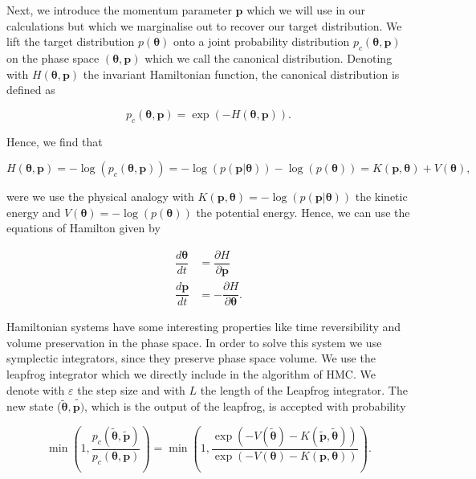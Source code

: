 \documentclass[12pt,a4paper,oneside]{book}
\begin{document}
Next, we introduce the momentum parameter $\bm{p}$ which we will use in our calculations but which we marginalise out to recover our target distribution. We lift the target distribution $p(\bm{\theta}) $ onto a joint probability distribution $p_c(\bm{\theta}, \bm{p})$ on the phase space $(\bm{\theta}, \bm{p})$ which we call the canonical distribution. Denoting with $H(\bm{\theta}, \bm{p})$ the invariant Hamiltonian function, the canonical distribution is defined as

\begin{equation}
p_c(\bm{\theta}, \bm{p}) = \exp(-H(\bm{\theta}, \bm{p})).
\end{equation}

Hence, we find that 

\begin{equation}
H(\bm{\theta}, \bm{p}) = -\log(p_c(\bm{\theta}, \bm{p}) ) = -\log(p( \bm{p} |\bm{\theta})) - \log(p(\bm{\theta})) = K(\bm{p}, \bm{\theta}) + V(\bm{\theta}),
\end{equation}

were we use the physical analogy with $K(\bm{p}, \bm{\theta}) = -\log(p( \bm{p} |\bm{\theta}))$ the kinetic energy and $V(\bm{\theta}) = - \log(p(\bm{\theta})) $ the potential energy. Hence, we can use the equations of Hamilton given by

\begin{equation}
\begin{aligned}
\dfrac{d \bm{\theta}}{dt} &= \dfrac{\partial H}{\partial \bm{p}}  \\
\dfrac{d \bm{p}}{dt} &= - \dfrac{\partial H}{\partial \bm{\theta}} .
\end{aligned}
\end{equation}

Hamiltonian systems have some interesting properties like time reversibility and volume preservation in the phase space. In order to solve this system we use symplectic integrators, since they preserve phase space volume. We use the leapfrog integrator which we directly include in the algorithm of HMC. We denote with $\varepsilon$ the step size and with $L$ the length of the Leapfrog integrator. The new state ($\tilde{\bm{\theta}},\tilde{\bm{p})}$, which is the output of the leapfrog, is accepted with probability 

\begin{equation}
\min \left( 1 , \dfrac{p_c(\tilde{\bm{\theta}}, \tilde{\bm{p}}) }{p_c(\bm{\theta}, \bm{p}) } \right) = \min \left( 1 , \dfrac{\exp ( - V(\tilde{\bm{\theta}}) -  K(\tilde{\bm{p}}, \tilde{\bm{\theta}}))  }{\exp ( - V(\bm{\theta}) -  K(\bm{p}, \bm{\theta})) } \right).
\end{equation}
\end{document}
